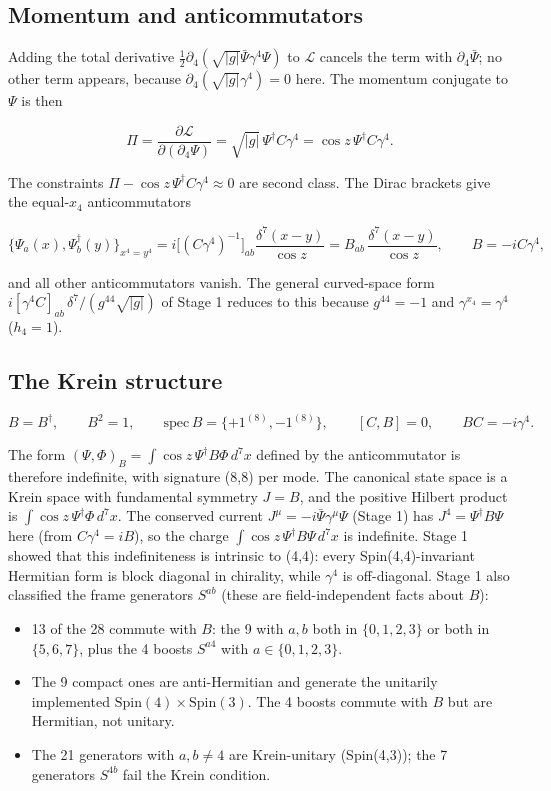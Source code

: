 \documentclass[11pt]{article}
\begin{document}
\subsection{Momentum and anticommutators}

Adding the total derivative $\tfrac12\partial_4(\sqrt{|g|}\bar\Psi\gamma^4\Psi)$ to $\mathcal L$ cancels the term with $\partial_4\bar\Psi$; no other term appears, because $\partial_4(\sqrt{|g|}\gamma^4)=0$ here. The momentum conjugate to $\Psi$ is then

\[
\Pi=\frac{\partial\mathcal L}{\partial(\partial_4\Psi)}=\sqrt{|g|}\,\Psi^\dagger C\gamma^4=\cos z\,\Psi^\dagger C\gamma^4 .
\]

The constraints $\Pi-\cos z\,\Psi^\dagger C\gamma^4\approx0$ are second class. The Dirac brackets give the equal-$x_4$ anticommutators

\[
\{\Psi_a(x),\Psi_b^\dagger(y)\}_{x^4=y^4}=i\bigl[(C\gamma^4)^{-1}\bigr]_{ab}\frac{\delta^7(x-y)}{\cos z}=B_{ab}\,\frac{\delta^7(x-y)}{\cos z},\qquad B=-iC\gamma^4,
\]

and all other anticommutators vanish. The general curved-space form $i[\gamma^4C]_{ab}\,\delta^7/(g^{44}\sqrt{|g|})$ of Stage 1 reduces to this because $g^{44}=-1$ and $\gamma^{x_4}=\gamma^4$ ($h_4=1$).

\subsection{The Krein structure}

\[
B=B^\dagger,\qquad B^2=1,\qquad \mathrm{spec}\,B=\{+1^{(8)},-1^{(8)}\},\qquad [C,B]=0,\qquad BC=-i\gamma^4 .
\]

The form $(\Psi,\Phi)_B=\int\cos z\,\Psi^\dagger B\Phi\,d^7x$ defined by the anticommutator is therefore indefinite, with signature (8,8) per mode. The canonical state space is a Krein space with fundamental symmetry $J=B$, and the positive Hilbert product is $\int\cos z\,\Psi^\dagger\Phi\,d^7x$. The conserved current $J^\mu=-i\bar\Psi\gamma^\mu\Psi$ (Stage 1) has $J^4=\Psi^\dagger B\Psi$ here (from $C\gamma^4=iB$), so the charge $\int\cos z\,\Psi^\dagger B\Psi\,d^7x$ is indefinite. Stage 1 showed that this indefiniteness is intrinsic to (4,4): every Spin(4,4)-invariant Hermitian form is block diagonal in chirality, while $\gamma^4$ is off-diagonal. Stage 1 also classified the frame generators $S^{ab}$ (these are field-independent facts about $B$):

\begin{itemize}
\item 13 of the 28 commute with $B$: the 9 with $a,b$ both in $\{0,1,2,3\}$ or both in $\{5,6,7\}$, plus the 4 boosts $S^{a4}$ with $a\in\{0,1,2,3\}$.
\item The 9 compact ones are anti-Hermitian and generate the unitarily implemented $\mathrm{Spin}(4)\times\mathrm{Spin}(3)$. The 4 boosts commute with $B$ but are Hermitian, not unitary.
\item The 21 generators with $a,b\ne4$ are Krein-unitary (Spin(4,3)); the 7 generators $S^{4b}$ fail the Krein condition.
\end{itemize}
\end{document}
